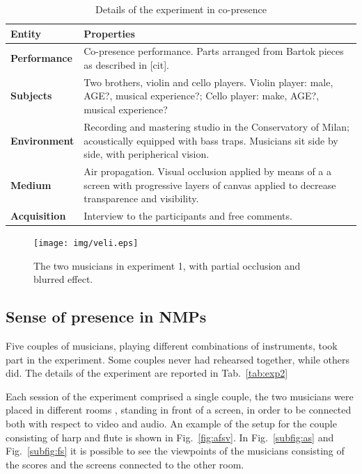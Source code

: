 \begin{table}
\centering
\caption{Details of the experiment in co-presence}
\begin{tabular}{p{1.5cm}p{6cm}}
\hline
\textbf{Entity} & \textbf{Properties} \\
\hline
\textbf{Performance} & Co-presence performance. \newline Parts arranged from Bartok pieces as described in [cit]. \\
\textbf{Subjects} & Two brothers, violin and cello players. \newline Violin player: male, AGE?, musical experience?; 	\newline Cello player: make, AGE?, musical experience?\\
\textbf{Environment} & Recording and mastering studio in the Conservatory of Milan; acoustically equipped with bass traps. \newline Musicians sit side by side, with peripherical vision.\\
\textbf{Medium} & Air propagation. \newline Visual occlusion applied by means of a a screen with progressive layers of canvas applied to decrease transparence and visibility. \\
\textbf{Acquisition} & Interview to the participants and free comments.\\
\hline
\end{tabular}
\label{tab:exp1}
\end{table}


\begin{figure}[t]
	\centering
	\texttt{[image: img/veli.eps]}
	\caption{The two musicians in experiment 1, with partial occlusion and blurred effect.}
	\label{fig:veli}
\end{figure}


\subsection{Sense of presence in NMPs}
Five couples of musicians, playing different combinations of instruments, took part in the experiment. Some couples never had rehearsed together, while others did. The details of the experiment are reported in Tab.~\ref{tab:exp2}

Each session of the experiment comprised a single couple, the two musicians were placed in different rooms , standing in front of a screen, in order to be connected both with respect to video and audio. An example of the setup for the couple consisting of harp and flute is shown in Fig.~\ref{fig:afsv}. In Fig.~\ref{subfig:as} and Fig.~\ref{subfig:fs} it is possible to see the viewpoints of the musicians consisting of the scores and the screens connected to the other room.

